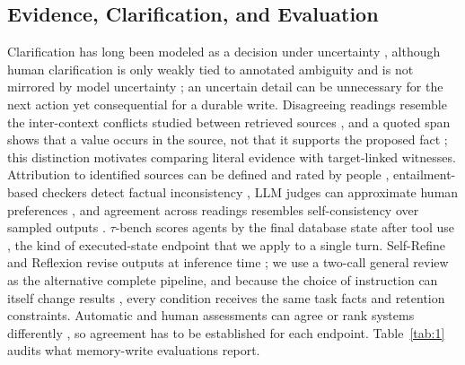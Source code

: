 \documentclass[acmsmall,review,anonymous]{acmart}
\begin{document}
\subsection{Evidence, Clarification, and Evaluation}
Clarification has long been modeled as a decision under uncertainty \cite{cite43,cite24,cite8,cite9,cite45}, although human clarification is only weakly tied to annotated ambiguity \cite{cite19} and is not mirrored by model uncertainty \cite{cite32}; an uncertain detail can be unnecessary for the next action yet consequential for a durable write. Disagreeing readings resemble the inter-context conflicts studied between retrieved sources \cite{cite38}, and a quoted span shows that a value occurs in the source, not that it supports the proposed fact \cite{cite1}; this distinction motivates comparing literal evidence with target-linked witnesses. Attribution to identified sources can be defined and rated by people \cite{cite25}, entailment-based checkers detect factual inconsistency \cite{cite13}, LLM judges can approximate human preferences \cite{cite46}, and agreement across readings resembles self-consistency over sampled outputs \cite{cite36}. $\tau$-bench scores agents by the final database state after tool use \cite{cite41}, the kind of executed-state endpoint that we apply to a single turn. Self-Refine and Reflexion revise outputs at inference time \cite{cite18,cite29}; we use a two-call general review as the alternative complete pipeline, and because the choice of instruction can itself change results \cite{cite2}, every condition receives the same task facts and retention constraints. Automatic and human assessments can agree \cite{cite30} or rank systems differently \cite{cite28}, so agreement has to be established for each endpoint. Table~\ref{tab:1} audits what memory-write evaluations report.
\end{document}
